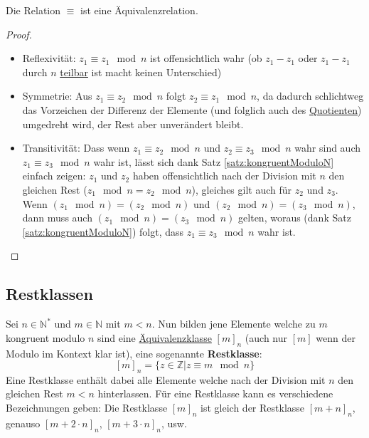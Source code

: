 \documentclass[../../main.tex]{subfiles}
\begin{document}
	\begin{theorem}
		Die Relation $\equiv$ ist eine Äquivalenzrelation.
		\begin{proof}\hspace*{1cm}
			\begin{itemize}
				\item Reflexivität: $z_1 \equiv z_1 \mod n$ ist offensichtlich wahr (ob $z_1-z_1$ oder $z_1-z_1$ durch $n$ \hyperref[def:teilbar]{teilbar} ist macht keinen Unterschied)
				\item Symmetrie: Aus $z_1 \equiv z_2 \mod n$ folgt $z_2 \equiv z_1 \mod n$, da dadurch schlichtweg das Vorzeichen der Differenz der Elemente (und folglich auch des \hyperref[def:Quotient]{Quotienten}) umgedreht wird, der Rest aber unverändert bleibt. 
				\item Transitivität: Dass wenn $z_1 \equiv z_2 \mod n$ und $z_2 \equiv z_3 \mod n$ wahr sind auch $z_1 \equiv z_3 \mod n$ wahr ist, lässt sich dank Satz \ref{satz:kongruentModuloN} einfach zeigen: $z_1$ und $z_2$ haben offensichtlich nach der Division mit $n$ den gleichen Rest ($z_1 \mod n = z_2 \mod n$), gleiches gilt auch für $z_2$ und $z_3$. Wenn $(z_1 \mod n) = (z_2 \mod n)$ und $(z_2 \mod n) = (z_3 \mod n)$, dann muss auch $(z_1 \mod n) = (z_3 \mod n)$ gelten, woraus (dank Satz \ref{satz:kongruentModuloN}) folgt, dass $z_1 \equiv z_3 \mod n$ wahr ist.
			\end{itemize}
		\end{proof}
	\end{theorem}

	\subsection{Restklassen}
	\begin{definition}[Restklasse]
		\label{def:Restklasse}
		Sei $n \in \mathbb{N}^*$ und $m \in \mathbb{N}$ mit $m < n$. Nun bilden jene Elemente welche zu $m$ kongruent modulo $n$ sind eine \hyperref[def:Äquivalenzklasse]{Äquivalenzklasse} $[m]_n$ (auch nur $[m]$ wenn der Modulo im Kontext klar ist), eine sogenannte \textbf{Restklasse}: $$[m]_n = \{z \in \mathbb{Z} | z \equiv m \mod n \}$$ Eine Restklasse enthält dabei alle Elemente welche nach der Division mit $n$ den gleichen Rest $m<n$ hinterlassen. Für eine Restklasse kann es verschiedene Bezeichnungen geben: Die Restklasse $[m]_n$ ist gleich der Restklasse $[m+n]_n$, genauso $[m+2\cdot n]_n$, $[m+3\cdot n]_n$, usw.
	\end{definition}
	
\end{document}
